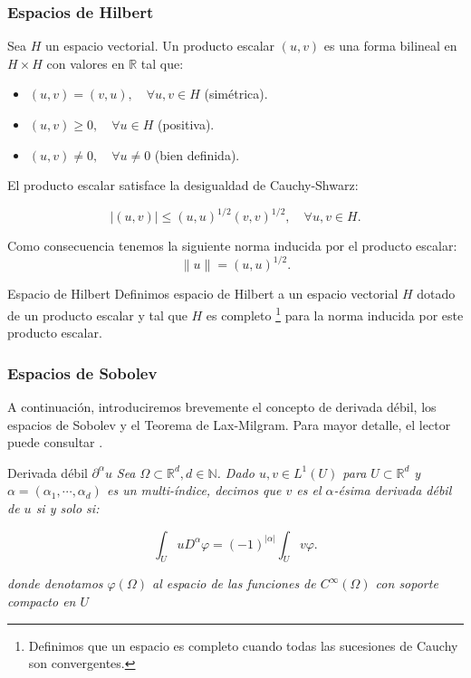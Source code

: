 \subsubsection{Espacios de Hilbert}

Sea $H$ un espacio vectorial. Un producto escalar $(u,v)$ es una forma bilineal en $H \times H$ con valores en $\mathbb R$ tal que:

\begin{itemize}
    \item $(u,v)=(v,u), \quad \forall u,v \in H$ (simétrica).
    \item $(u,v)\geq 0, \quad \forall u \in H$ (positiva).
    \item $(u,v) \neq 0, \quad \forall u \neq 0$ (bien definida).
\end{itemize}

El producto escalar satisface la desigualdad de Cauchy-Shwarz:

\begin{equation}
    |(u,v)|\leq (u,u)^{1/2}(v,v)^{1/2}, \quad \forall u,v \in H.
\end{equation}

Como consecuencia tenemos la siguiente norma inducida por el producto escalar:
\begin{equation}
    \|u\|=(u,u)^{1/2}.
\end{equation}
\begin{definicion1}[label={definicion1},nameref={Title or anything else}]{Espacio de Hilbert}
    Definimos espacio de Hilbert a un espacio vectorial $H$ dotado de un producto escalar y tal que $H$ es completo \footnote{Definimos que un espacio es completo cuando todas las sucesiones de Cauchy son convergentes.} para la norma inducida por este producto escalar.
\end{definicion1}


\subsubsection{Espacios de Sobolev}

A continuación, introduciremos brevemente el concepto de derivada débil, los espacios de Sobolev y el Teorema de Lax-Milgram. Para mayor detalle, el lector puede consultar \cite{sobolev4,sobolev6}.


\begin{definicion1}[label={definicion1},nameref={Title or anything else}]{Derivada débil $\partial^{\alpha}u$ }
    \textit{Sea $\Omega \subset \mathbb R^{d}, d \in \mathbb N$. Dado $u,v \in L^{1}(U)$ para $U \subset \mathbb R^{d}$ y $\alpha=(\alpha_{1},\cdots,\alpha_{d})$ es un multi-índice, decimos que $v$ es el $\alpha$-ésima derivada débil de $u$ si y solo si:}
    
    \begin{equation}
        \displaystyle \int_{U} uD^{\alpha}\varphi=(-1)^{|\alpha|}\int_{U}v\varphi.
    \end{equation}
    
    \textit{donde denotamos $\varphi(\Omega)$ al espacio de las funciones de $C^{\infty}(\Omega)$ con soporte compacto en $U$}
    
\end{definicion1}

